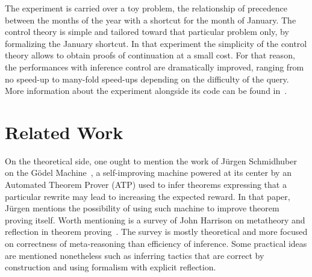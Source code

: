 \documentclass{easychair}
\begin{document}
The experiment is carried over a toy problem, the relationship of
precedence between the months of the year with a shortcut for the
month of January.  The control theory is simple and tailored toward
that particular problem only, by formalizing the January shortcut.
In that experiment the simplicity of the control theory allows to
obtain proofs of continuation at a small cost.  For that reason, the
performances with inference control are dramatically improved, ranging
from no speed-up to many-fold speed-ups depending on the difficulty of
the query.  More information about the experiment alongside its code
can be found in~\cite{Geisweiller2024ICM}.






\section{Related Work}

On the theoretical side, one ought to mention the work of J\"urgen
Schmidhuber on the G\"odel Machine~\cite{Schmidhuber2003}, a
self-improving machine powered at its center by an Automated Theorem
Prover (ATP) used to infer theorems expressing that a particular
rewrite may lead to increasing the expected reward.  In that paper,
J\"urgen mentions the possibility of using such machine to improve
theorem proving itself.  Worth mentioning is a survey of John Harrison
on metatheory and reflection in theorem
proving~\cite{Harrison1995MetatheoryAR}.  The survey is mostly
theoretical and more focused on correctness of meta-reasoning than
efficiency of inference.  Some practical ideas are mentioned
nonetheless such as inferring tactics that are correct by construction
and using formalism with explicit reflection.
\end{document}

